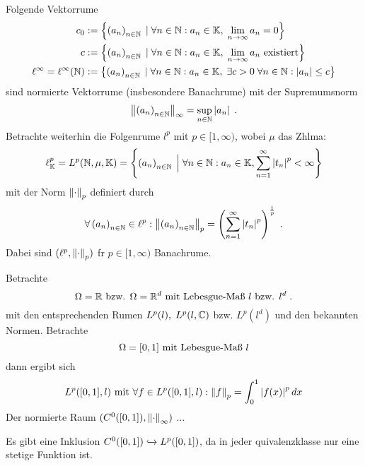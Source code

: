 \begin{ex}
	Folgende Vektorr\as ume 
	\begin{align*}
		 c_0 &:= \left\{\left (a_n\right )_{n\in \mathbb{N}} \;\vert\; \forall n \in\mathbb{N}: a_n \in \mathbb{K}, \; \lim_{n \to \infty} a_n  = 0\right\}\\
		c &:= \left\{\left (a_n\right )_{n\in \mathbb{N}} \;\vert\; \forall n\in \mathbb{N}: a_n \in \mathbb{K}, \; \lim_{n \to \infty} a_n \text{ existiert}\right\}\\
	   \ell^\infty = \ell^\infty(\mathbb{N}) &:= \left\{\left (a_n\right )_{n\in \mathbb{N}} \;\vert\; \forall n\in \mathbb{N}: a_n \in \mathbb{K},\; \exists c>0\;\forall n\in\mathbb{N}: \left\lvert a_n \right\rvert \leq c\right\}
	\end{align*}
	sind normierte Vektorr\as ume (insbesondere Banachr\as ume) mit  der Supremumsnorm 
	\[\left\lVert\left (a_n\right )_{n\in \mathbb{N}}\right\rVert_\infty = \sup_{n\in\mathbb{N}}\left\lvert a_n \right\rvert\;.\]
	Betrachte weiterhin die Folgenr\as ume \(l^p\) mit \(p \in [1,\infty)\), wobei $\mu$ das Z\as hlma\s{}:
	\[\ell_{\mathbb{K}}^p = L^p(\mathbb{N}, \mu,\mathbb{K}) = \left\{\left (a_n\right )_{n\in \mathbb{N}} \;\Big\vert\; \forall n\in \mathbb{N}: a_n \in \mathbb{K}, \sum_{n=1}^\infty \left\lvert t_n \right\rvert^p < \infty\right\}\]
	mit der Norm \(\left\lVert\cdot\right\rVert_p\) definiert durch
	\[\forall \left (a_n\right )_{n\in \mathbb{N}} \in \ell^p: \left\lVert\left (a_n\right )_{n\in \mathbb{N}}\right\rVert_p = \left(\sum_{n=1}^\infty \left\lvert t_n \right\rvert^p\right)^\frac{1}{p}\;.\]
	Dabei sind \((\ell^p, \left\lVert\cdot\right\rVert_p)\) f\us r \(p \in [1,\infty)\) Banachr\as ume. 
\end{ex}

\begin{ex}
	Betrachte
	\[\Omega = \mathbb{R}  \text{ bzw. } \Omega = \mathbb{R}^d\text{ mit Lebesgue-Ma{\ss}{} } l \text{ bzw. } l^d\;.\]
	mit den entsprechenden R\as umen \(L^p(l), \; L^p(l,\mathbb{C})\) bzw. \(L^p(l^d)\) und den bekannten Normen.
	Betrachte 
	\[\Omega = [0,1] \text{ mit Lebesgue-Ma{\ss}{} } l \]
	dann ergibt sich 
	\[L^p([0,1],l) \text{ mit } \forall f\in L^p([0,1],l): \left\lVert f\right\rVert_p = \int_0^1 \left\lvert f(x) \right\rvert^p dx\]
	Der normierte Raum \((C^0([0,1]), \left\lVert\cdot\right\rVert_\infty)\) $\ldots$ 
	\end{ex}
	\begin{rem}
		Es gibt eine Inklusion \(C^0([0,1])\xhookrightarrow{} L^p([0,1])\), da in jeder \As quivalenzklasse nur eine stetige Funktion ist.
	\end{rem}